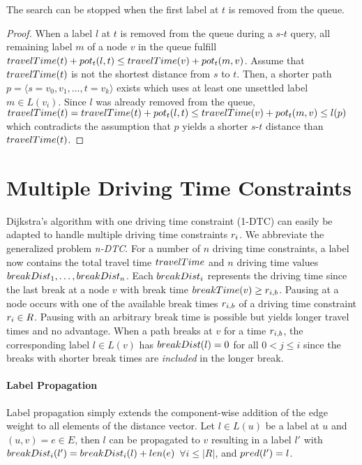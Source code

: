 \begin{theorem}\label{theorem:pot_stop_criterion}
	The search can be stopped when the first label at $t$ is removed from the queue.
\end{theorem}

\begin{proof}
	When a label $l$ at $t$ is removed from the queue during a $s$-$t$ query, all remaining label $m$ of a node $v$ in the queue fulfill $travelTime(t) + pot_t(l,t) \le travelTime(v) + pot_t(m,v)$. Assume that $travelTime(t)$ is not the shortest distance from $s$ to $t$. Then, a shorter path $p = \langle s=v_0,v_1,\ldots,t=v_k \rangle$ exists which uses at least one unsettled label $m \in L(v_i)$. Since $l$ was already removed from the queue, $travelTime(t) = travelTime(t) + pot_t(l,t) \le  travelTime(v) + pot_t(m,v) \le l(p)$ which contradicts the assumption that $p$ yields a shorter $s$-$t$ distance than $travelTime(t)$.
\end{proof}

\section{Multiple Driving Time Constraints}
Dijkstra's algorithm with one driving time constraint (1-DTC) can easily be adapted to handle multiple driving time constraints $r_i$. We abbreviate the generalized problem \emph{n-DTC}. For a number of $n$ driving time constraints, a label now contains the total travel time $travelTime$ and $n$ driving time values $breakDist_1, \ldots , breakDist_n$. Each $breakDist_i$ represents the driving time since the last break at a node $v$ with break time $breakTime(v) \ge r_{i,b}$. Pausing at a node occurs with one of the available break times $r_{i,b}$ of a driving time constraint $r_i \in R$. Pausing with an arbitrary break time is possible but yields longer travel times and no advantage. When a path breaks at $v$ for a time $r_{i,b}$, the corresponding label $l \in L(v)$ has $breakDist(l) = 0$ for all $0 < j \le i$ since the breaks with shorter break times are \emph{included} in the longer break.

\paragraph{Label Propagation}
Label propagation simply extends the component-wise addition of the edge weight to all elements of the distance vector. Let $l \in L(u)$ be a label at $u$ and $(u,v) = e \in E$, then $l$ can be propagated to $v$ resulting in a label $l'$ with $breakDist_i(l') = breakDist_i(l) + len(e)$ $\forall i \le |R|$, and $pred(l') = l$.

